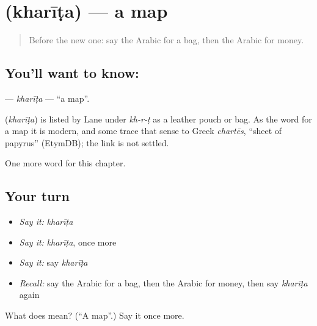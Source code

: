 \section[\texorpdfstring{\ar{خريطة} (kharīṭa)}{خريطة (kharīṭa)}]{ (kharīṭa) — a map}

\label{lesson:AR-C74-kharita}



\begin{quote}
Before the new one: say the Arabic for a bag, then the Arabic for money.
\end{quote}

\subsection*{You'll want to know: }
\textbf{} — \emph{kharīṭa} — \textquotedblleft{}a map\textquotedblright{}.

\begin{cousinweb}
\textbf{} (\emph{kharīṭa}) is listed by Lane under \emph{kh-r-ṭ} as a leather pouch or bag. As the word for a map it is modern, and some trace that sense to Greek \emph{chartēs}, \textquotedblleft{}sheet of papyrus\textquotedblright{} (EtymDB); the link is not settled.
\end{cousinweb}

\begin{grammarlens}[title={What you've built}]
One more word for this chapter.
\end{grammarlens}

\subsection*{Your turn}
\begin{itemize}
\raggedright
  \item \emph{Say it:} \emph{kharīṭa}
  \item \emph{Say it:} \emph{kharīṭa}, once more
  \item \emph{Say it:} say \emph{kharīṭa}
  \item \emph{Recall:} say the Arabic for a bag, then the Arabic for money, then say \emph{kharīṭa} again
\end{itemize}

\begin{tcolorbox}[breakable,colback=teal!4,colframe=teal!35!black,title={Before you move on}]
What does  mean? (\textquotedblleft{}A map\textquotedblright{}.) Say it once more.
\end{tcolorbox}
